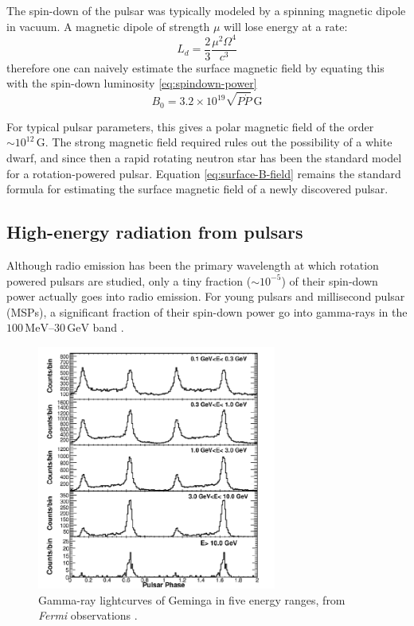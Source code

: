 The spin-down of the pulsar was typically modeled by a spinning magnetic dipole
in vacuum. A magnetic dipole of strength $\mu$ will lose energy at a rate:
\begin{equation}
  \label{eq:dipole-spin-down}
  L_{d} = \frac{2}{3}\frac{\mu^2\Omega^4}{c^3}
\end{equation}
therefore one can naively estimate the surface magnetic field by equating this
with the spin-down luminosity \eqref{eq:spindown-power}
\begin{equation}
  \label{eq:surface-B-field}
  B_0 = 3.2\times 10^{19}\sqrt{P \dot{P}}\,\mathrm{G}
\end{equation}

For typical pulsar parameters, this gives a polar magnetic field of the order
$\sim 10^{12}\,\mathrm{G}$. The strong magnetic field required rules out the
possibility of a white dwarf, and since then a rapid rotating neutron star has
been the standard model for a rotation-powered pulsar. Equation
\eqref{eq:surface-B-field} remains the standard formula for estimating the surface
magnetic field of a newly discovered pulsar.

\subsection{High-energy radiation from pulsars}
\label{sec:observ-high-energy}

Although radio emission has been the primary wavelength at which rotation
powered pulsars are studied, only a tiny fraction ($\sim 10^{-5}$) of their
spin-down power actually goes into radio emission. For young pulsars and
millisecond pulsar (MSPs), a significant fraction of their spin-down power go
into gamma-rays in the $100\,\mathrm{MeV}$--$30\,\mathrm{GeV}$ band \citep[see
e.g.][]{abdo_fermi_2010}.

\begin{figure}[h]
  \centering
  \includegraphics[width=0.7\textwidth]{pics/intro/geminga2.png}
  \caption[Gamma-ray lightcurves of Geminga]{Gamma-ray lightcurves of Geminga in
    five energy ranges, from {\it Fermi} observations
    \citep{abdo_fermi-lat_2010}.}
  \label{fig:geminga}
\end{figure}

